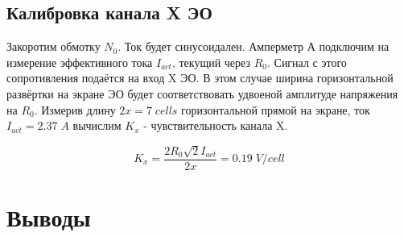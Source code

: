 \documentclass{article}
\begin{document}
\subsection{Калибровка канала X ЭО}

Закоротим обмотку \(N_0\). Ток будет синусоидален. Амперметр А подключим на измерение эффективного тока \(I_{act}\),
текущий через \(R_0\). Сигнал с этого сопротивления подаётся на вход X ЭО. В этом случае ширина горизонтальной
развёртки на экране ЭО будет соответствовать удвоеной амплитуде напряжения на \(R_0\). Измерив длину \(2x = 7\; cells\)
горизонтальной прямой на экране, ток \(I_{act} = 2.37\; A\) вычислим \(K_x\) - чувствительность канала X.

\[ K_x = \frac{2R_0\sqrt{2}I_{act}}{2x} = 0.19\; V/cell\]

\section{Выводы}
\end{document}
